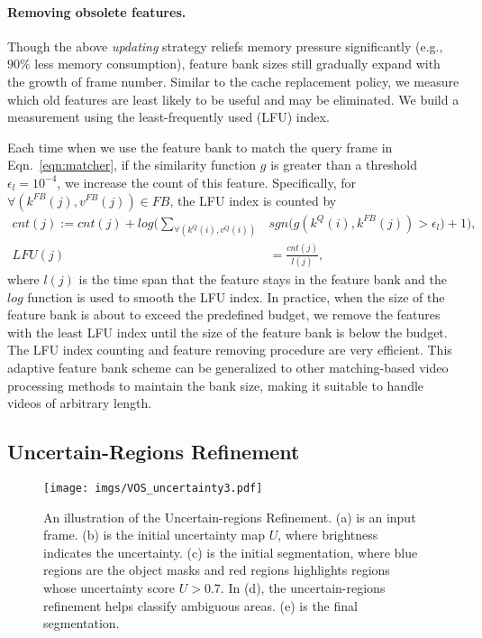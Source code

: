 \documentclass{article}
\begin{document}
\paragraph{Removing obsolete features.}
Though the above {\itshape updating} strategy reliefs memory pressure significantly (e.g., $90\%$ less memory consumption), feature bank sizes still gradually expand with the growth of frame number.
Similar to the cache replacement policy, we measure which old features are least likely to be useful and may be eliminated.
We build a measurement using the least-frequently used (LFU) index.

Each time when we use the feature bank to match the query frame in Eqn.~\ref{eqn:matcher}, if the similarity function $g$ is greater than a threshold $\epsilon_l=10^{-4}$, we increase the count of this feature.  
Specifically, for $\forall (k^{FB}(j), v^{FB}(j))\in FB$, the LFU index is counted by
\begin{equation}
    \begin{split}
        cnt(j) := cnt(j) + log\big(\sum_{\forall (k^Q(i), v^Q(i))} & sgn\big(g(k^Q(i), k^{FB}(j)) > \epsilon_l\big)+1\big),\\
        LFU(j) &= \frac{cnt(j)}{l(j)},
    \end{split}
\end{equation}
where $l(j)$ is the time span that the feature stays in the feature bank and the $log$ function is used to smooth the LFU index.
In practice, when the size of the feature bank is about to exceed the predefined budget, we remove the features with the least LFU index until the size of the feature bank is below the budget.  
The LFU index counting and feature removing procedure are very efficient.
This adaptive feature bank scheme can be generalized to other matching-based video processing methods to maintain the bank size, making it suitable to handle videos of arbitrary length.

\subsection{Uncertain-Regions Refinement}
\label{sec:uncertainty}

\begin{figure}
    \centering
    \texttt{[image: imgs/VOS\_uncertainty3.pdf]}
    \caption{An illustration of the Uncertain-regions Refinement. (a) is an input frame. (b) is the initial uncertainty map $U$, where brightness indicates the uncertainty. (c) is the initial segmentation, where blue regions are the object masks and red regions highlights regions whose uncertainty score $U > 0.7$. In (d), the uncertain-regions refinement helps classify ambiguous areas. (e) is the final segmentation.  }
    \label{fig:uncertainty}
\end{figure}
\end{document}
